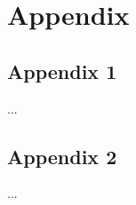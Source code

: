 %
%




\renewcommand\thesection{\Alph{section}}

\setcounter{section}{0}

\chapter*{Appendix}

\label{chap:Appendix}

\section{Appendix 1}
\label{sec:Appendix1}

...


\section{Appendix 2}
\label{sec:Appendix2}

...

\cleardoublepage